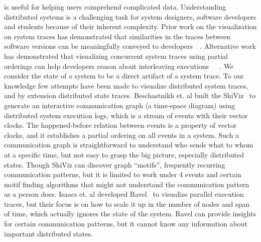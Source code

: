  is useful for helping users
comprehend complicated data.  Understanding distributed systems is a
challenging task for system designers, software developers and
students because of their inherent complexity.  Prior work on the
visualization on system traces has demonstrated that similarities in
the traces between software versions can be meaningfully conveyed to
developers~\cite{6613833}~\cite{Reynolds_detectingthe}. Alternative
work has demonstrated that visualizing concurrent system traces using
partial orderings can help developers reason about interleaving
executions~\cite{6650534}~\cite{7272586}~\cite{isaacs2014combing}.  We
consider the state of a system to be a direct artifact of a system
trace.  To our knowledge few attempts have been made to visualize
distributed system traces, and by extension distributed state traces.
Beschastnikh et. al built the ShiViz~\cite{BeschastnikhWBE2016} to
generate an interactive communication graph (a time-space diagram)
using distributed system execution logs, which is a stream of events
with their vector clocks.  The happened-before relation between events
is a property of vector clocks, and it establishes a partial ordering
on all events in a system.  Such a communication graph is
straightforward to understand who sends what to whom at a specific
time, but not easy to grasp the big picture, especially distributed
states.  Though ShiViz can discover graph ``motifs'', frequently
recurring communication patterns, but it is limited to work under 4
events and certain motif finding algorithms that might not understand
the communication pattern as a person does.  Isaacs et. al developed
Ravel~\cite{isaacs2014combing} to visualize parallel execution traces,
but their focus is on how to scale it up in the number of nodes and
span of time, which actually ignores the state of the system.  Ravel
can provide insights for certain communication patterns, but it cannot
know any information about important distributed states.


